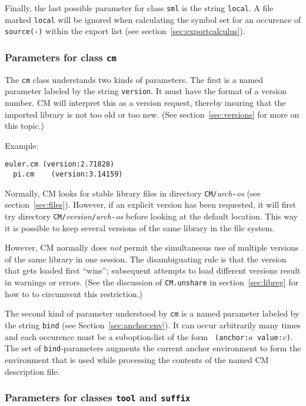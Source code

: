 Finally, the last possible parameter for class {\tt sml} is the string
{\tt local}.  A file marked {\tt local} will be ignored when
calculating the symbol set for an occurence of {\tt source(-)} within
the export list (see section~\ref{sec:exportcalculus}).

\subsubsection{Parameters for class {\tt cm}}
\label{sec:toolparam:cm}

The {\tt cm} class understands two kinds of parameters.  The first is
a named parameter labeled by the string {\tt version}.  It must have
the format of a version number.  CM will interpret this as a version
request, thereby insuring that the imported library is not too old or
too new. (See section~\ref{sec:versions} for more on this topic.)

Example:

\begin{lstlisting}[language=CM]
  euler.cm (version:2.71828)
  pi.cm    (version:3.14159)
\end{lstlisting}%

Normally, CM looks for stable library files in directory
{\tt CM/}{\it arch}{\tt -}{\it os} (see section~\ref{sec:files}).
However, if an explicit version has been requested, it will first try
directory {\tt CM/}{\it version}{\tt /}{\it arch}{\tt -}{\it os}
before looking at the default location.  This way it is possible to
keep several versions of the same library in the file system.

However, CM normally does {\em not} permit the simultaneous use of
multiple versions of the same library in one session.  The
disambiguating rule is that the version that gets loaded first
``wins''; subsequent attempts to load different versions result in
warnings or errors.  (See the discussion of {\tt CM.unshare} in
section~\ref{sec:libreg} for how to to circumvent this restriction.)

The second kind of parameter understood by {\tt cm} is a named
parameter labeled by the string {\tt bind} (see
Section~\ref{sec:anchor:env}).  It can occur arbitrarily many times
and each occurence must be a suboption-list of the form {\tt
(anchor:$a$ value:$v$)}.  The set of {\tt bind}-parameters augments
the current anchor environment to form the environment that is used
while processing the contents of the named CM description file.

\subsubsection{Parameters for classes {\tt tool} and {\tt suffix}}

